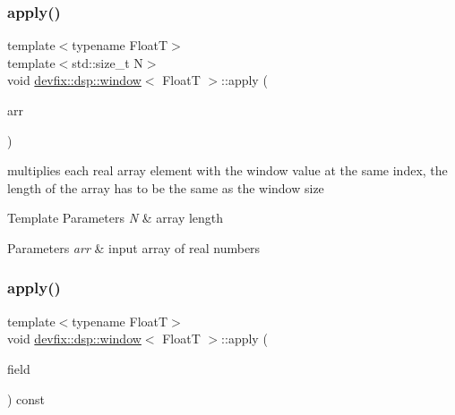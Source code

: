 \subsubsection{\texorpdfstring{apply()}{apply()}\hspace{0.1cm}{\footnotesize\ttfamily [3/6]}}
{\footnotesize\ttfamily template$<$typename FloatT$>$ \\
template$<$std\+::size\+\_\+t N$>$ \\
void \hyperlink{structdevfix_1_1dsp_1_1window}{devfix\+::dsp\+::window}$<$ FloatT $>$\+::apply (\begin{DoxyParamCaption}\item[{std\+::array$<$ FloatT, N $>$ \&}]{arr }\end{DoxyParamCaption})\hspace{0.3cm}{\ttfamily [inline]}}



multiplies each real array element with the window value at the same index, the length of the array has to be the same as the window size 


\begin{DoxyTemplParams}{Template Parameters}
{\em N} & array length \\
\hline
\end{DoxyTemplParams}

\begin{DoxyParams}{Parameters}
{\em arr} & input array of real numbers \\
\hline
\end{DoxyParams}
\mbox{\label{structdevfix_1_1dsp_1_1window_a8c378c67016543fe7d69bf84145994e6}} 
\subsubsection{\texorpdfstring{apply()}{apply()}\hspace{0.1cm}{\footnotesize\ttfamily [4/6]}}
{\footnotesize\ttfamily template$<$typename FloatT$>$ \\
void \hyperlink{structdevfix_1_1dsp_1_1window}{devfix\+::dsp\+::window}$<$ FloatT $>$\+::apply (\begin{DoxyParamCaption}\item[{std\+::complex$<$ FloatT $>$ $\ast$}]{field }\end{DoxyParamCaption}) const\hspace{0.3cm}{\ttfamily [inline]}}




